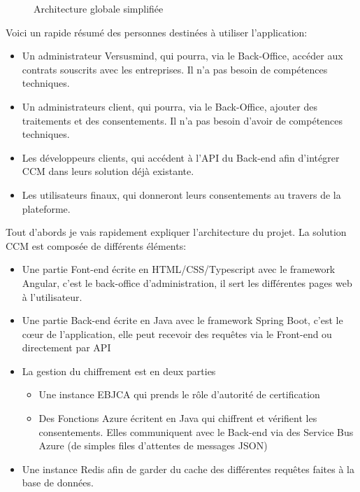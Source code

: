 \documentclass[12pt, a4paper]{report}
\begin{document}
\begin{figure}[H]
\begin{center}
    \end{center}
    \caption{Architecture globale simplifiée}
\end{figure}
Voici un rapide résumé des personnes destinées à utiliser l'application:
\begin{itemize}
    \item Un administrateur Versusmind, qui pourra, via le Back-Office, accéder aux contrats souscrits avec les entreprises. Il n'a pas besoin de compétences techniques.
    \item Un administrateurs client, qui pourra, via le Back-Office, ajouter des traitements et des consentements. Il n'a pas besoin d'avoir de compétences techniques.
    \item Les développeurs clients, qui accédent à l'API du Back-end afin d'intégrer CCM dans leurs solution déjà existante.
    \item Les utilisateurs finaux, qui donneront leurs consentements au travers de la plateforme.
\end{itemize}
Tout d'abords je vais rapidement expliquer l'architecture du projet.
La solution CCM est composée de différents éléments:
\begin{itemize}
    \item Une partie Font-end écrite en HTML/CSS/Typescript avec le framework Angular, c'est le back-office d'administration, il sert les différentes pages web à l'utilisateur.
    \item Une partie Back-end écrite en Java avec le framework Spring Boot, c'est le cœur de l'application, elle peut recevoir des requêtes via le Front-end ou directement par API
    \item La gestion du chiffrement est en deux parties
        \begin{itemize}
            \item Une instance EBJCA qui prends le rôle d'autorité de certification
            \item Des Fonctions Azure écritent en Java qui chiffrent et vérifient les consentements. Elles communiquent avec le Back-end via des Service Bus Azure (de simples files d'attentes de messages JSON)
        \end{itemize}
    \item Une instance Redis afin de garder du cache des différentes requêtes faites à la base de données.
\end{itemize}
\end{document}
